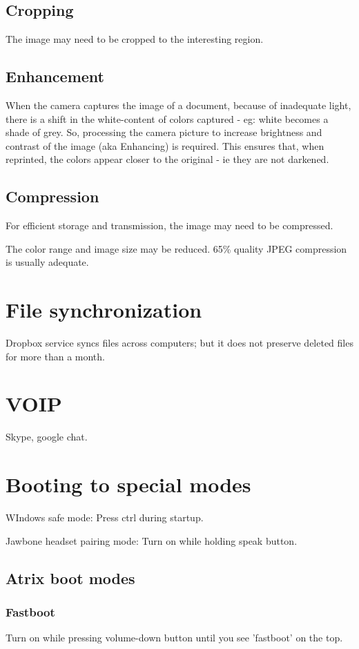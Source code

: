 \subsection{Cropping}
The image may need to be cropped to the interesting region.

\subsection{Enhancement}
When the camera captures the image of a document, because of inadequate light, there is a shift in the white-content of  colors captured - eg: white becomes a shade of grey. So, processing the camera picture to increase brightness and contrast of the image (aka Enhancing) is required. This ensures that, when reprinted, the colors appear closer to the original - ie they are not darkened.

\subsection{Compression}
For efficient storage and transmission, the image may need to be compressed.

The color range and image size may be reduced. 65\% quality JPEG compression is usually adequate.

\section{File synchronization}
Dropbox service syncs files across computers; but it does not preserve deleted files for more than a month.

\section{VOIP}
Skype, google chat.

\section{Booting to special modes}

WIndows safe mode: Press ctrl during startup.

Jawbone headset pairing mode: Turn on while holding speak button.

\subsection{Atrix boot modes}
\subsubsection{Fastboot}
Turn on while pressing volume-down button until you see 'fastboot' on the top.

